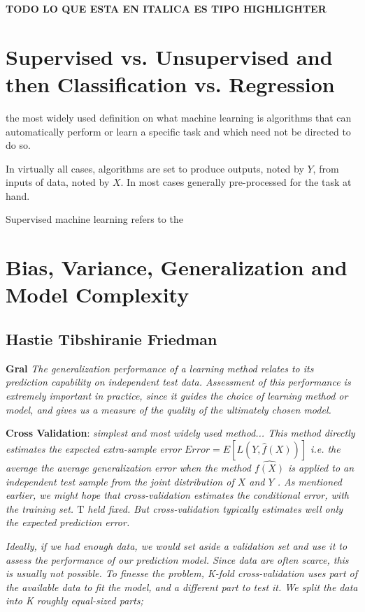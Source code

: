 \textbf{TODO LO QUE ESTA EN ITALICA ES TIPO HIGHLIGHTER}

\section{Supervised vs. Unsupervised and then Classification vs. Regression}
the most widely used definition on what machine learning is algorithms that can automatically perform or learn a specific task and which need not be directed to do so. 

In virtually all cases, algorithms are set to produce outputs, noted by $Y$, from inputs of data, noted by $X$. In most cases generally pre-processed for the task at hand.

Supervised machine learning refers to the 


\subsection{}


\section{Bias, Variance, Generalization and Model Complexity}

\subsection{Hastie Tibshiranie Friedman}

\textbf{Gral}
\textit{The generalization performance of a learning method relates to its prediction capability on independent test data. Assessment of this performance is extremely important in practice, since it guides the choice of learning method or model, and gives us a measure of the quality of the ultimately chosen model.}

\textbf{Cross Validation}:  
\textit{simplest and most widely used method... This method directly estimates the expected extra-sample error
$Error = E[L(Y,\hat{f}(X))] $ i.e. the average the average generalization error when the method $\hat{f(X)}$ is applied to an independent test sample from the joint distribution of $X$ and $Y$ . As mentioned earlier, we might hope that cross-validation estimates the conditional error, with the training set. $\mathrm{T}$ held fixed. But cross-validation typically estimates well only the expected prediction error.}

\textit{Ideally, if we had enough data, we would set aside a validation set and use it to assess the performance of our prediction model. Since data are often scarce, this is usually not possible. To finesse the problem, K-fold cross-validation uses part of the available data to fit the model, and a different part to test it. We split the data into K roughly equal-sized parts; }

